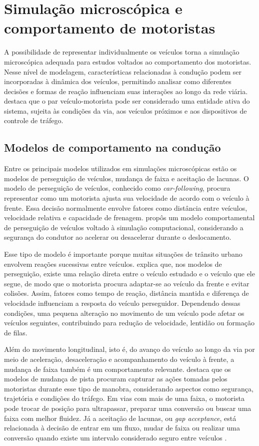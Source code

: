 \section{Simulação microscópica e comportamento de motoristas}

A possibilidade de representar individualmente os veículos torna a simulação microscópica adequada para estudos voltados ao comportamento dos motoristas. Nesse nível de modelagem, características relacionadas à condução podem ser incorporadas à dinâmica dos veículos, permitindo analisar como diferentes decisões e formas de reação influenciam suas interações ao longo da rede viária.  destaca que o par veículo-motorista pode ser considerado uma entidade ativa do sistema, sujeita às condições da via, aos veículos próximos e aos dispositivos de controle de tráfego.

\subsection{Modelos de comportamento na condução}

Entre os principais modelos utilizados em simulações microscópicas estão os modelos de perseguição de veículos, mudança de faixa e aceitação de lacunas. O modelo de perseguição de veículos, conhecido como \textit{car-following}, procura representar como um motorista ajusta sua velocidade de acordo com o veículo à frente. Essa decisão normalmente envolve fatores como distância entre veículos, velocidade relativa e capacidade de frenagem.  propôs um modelo comportamental de perseguição de veículos voltado à simulação computacional, considerando a segurança do condutor ao acelerar ou desacelerar durante o deslocamento.

Esse tipo de modelo é importante porque muitas situações de trânsito urbano envolvem reações sucessivas entre veículos.  explica que, nos modelos de perseguição, existe uma relação direta entre o veículo estudado e o veículo que ele segue, de modo que o motorista procura adaptar-se ao veículo da frente e evitar colisões. Assim, fatores como tempo de reação, distância mantida e diferença de velocidade influenciam a resposta do veículo perseguidor. Dependendo dessas condições, uma pequena alteração no movimento de um veículo pode afetar os veículos seguintes, contribuindo para redução de velocidade, lentidão ou formação de filas.

Além do movimento longitudinal, isto é, do avanço do veículo ao longo da via por meio de aceleração, desaceleração e acompanhamento do veículo à frente, a mudança de faixa também é um comportamento relevante.  destaca que os modelos de mudança de pista procuram capturar as ações tomadas pelos motoristas durante esse tipo de manobra, considerando aspectos como segurança, trajetória e condições do tráfego. Em vias com mais de uma faixa, o motorista pode trocar de posição para ultrapassar, preparar uma conversão ou buscar uma faixa com melhor fluidez. Já a aceitação de lacunas, ou \textit{gap acceptance}, está relacionada à decisão de entrar em um fluxo, mudar de faixa ou realizar uma conversão quando existe um intervalo considerado seguro entre veículos \cite{brambila_2008}.

